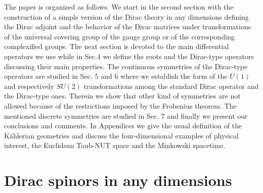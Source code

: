 \documentclass[a4paper,12pt]{article}
\begin{document}
The paper is organized as follows. We start in the second section with the 
construction of a simple version of the Dirac theory in any dimensions 
defining the Dirac adjoint and the behavior of the Dirac matrices under 
transformations of the universal covering group of the gauge group or of 
the corresponding complexified groups. The next section is devoted to the main 
differential operators we use while in Sec.4 we define the roots and the 
Dirac-type operators discussing their main properties. The continuous 
symmetries of the Dirac-type operators are studied in Sec. 5 and 6 where we 
establish the form of the $U(1)$ and respectively $SU(2)$ transformations 
among the standard Dirac operator and the Dirac-type ones. Therein we 
show that other kind of symmetries are not allowed because of the restrictions 
imposed by the Frobenius theorem. The mentioned discrete symmetries are studied 
in Sec. 7 and finally we present our conclusions and comments. In Appendices 
we give the usual definition of the K\"ahlerian geometries and discuss the 
four-dimensional examples of physical interest, the Euclidean Taub-NUT space 
and 
the Minkowski spacetime. 
     
     
\section{Dirac spinors in any dimensions}
\end{document}
